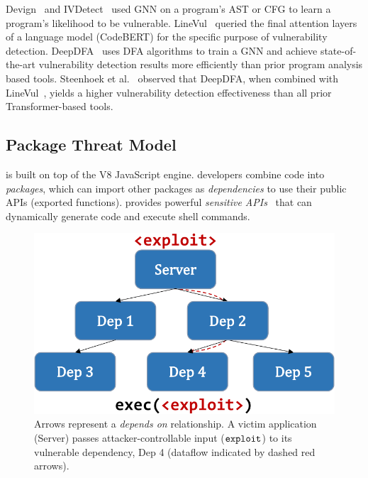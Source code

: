 \documentclass[12pt,openany,oneside,table]{cmuthesis}
\begin{document}
Devign~\cite{zhou2019devign} and IVDetect~\cite{ivdetect} used GNN on a program's AST or CFG to learn a program's likelihood to be vulnerable. LineVul~\cite{linevd} queried the final attention layers of a language model (CodeBERT) for the specific purpose of vulnerability detection. 
DeepDFA~\cite{deepdfa} uses DFA algorithms to train a GNN and achieve state-of-the-art vulnerability detection results more efficiently than prior program analysis based tools. Steenhoek et al.~\cite{deepdfa} observed that DeepDFA, when combined with LineVul~\cite{linevd}, yields a higher vulnerability detection effectiveness than all prior Transformer-based tools.



\subsection{\nodejs Package Threat Model}
\label{sec:background:threat-model}
\nodejs is %
built on top of the V8 JavaScript engine. \nodejs developers combine code into {\em packages}, which
can import other packages as \emph{dependencies} to use their public APIs (exported functions).
%
\nodejs provides powerful \emph{sensitive APIs}~\cite{eval_fn,new_function_fn,exec_fn,execsync_fn} that 
can dynamically generate code and execute shell commands.

\begin{figure}[t!]
  \centering
  \vspace{-3pt}
  \includegraphics[width=0.5\columnwidth]{figures/approach/attacker_model.pdf}
  \vspace{-5pt}
  \caption{Arrows represent a \emph{depends on} relationship.
    A victim application (Server) passes 
    attacker-controllable input ($\mathtt{exploit}$) to its vulnerable dependency, 
    Dep 4 (dataflow indicated by dashed red arrows).}
  \vspace{-5pt}
  \label{fig:attacker-model}
\end{figure}
\end{document}
